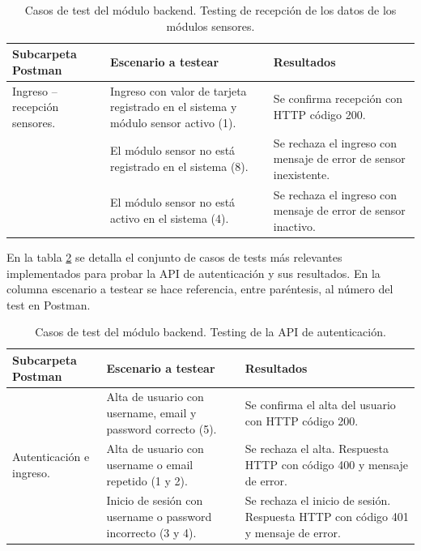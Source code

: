 \begin{table}[h]
	\centering
	\caption[Tipos de pruebas backend. Recepción de los datos de los módulos sensores]{Casos de test del módulo backend. Testing de recepción de los datos de los módulos sensores.}
	\begin{tabular}{p{3.5cm} p{4.5cm} p{4cm}} 	

		\toprule
		\textbf{Subcarpeta Postman} & 
		\textbf{Escenario a testear} &
		\textbf{Resultados} 
		\\
		\midrule

 Ingreso – recepción sensores.                  
& Ingreso con valor de tarjeta registrado en el sistema y módulo sensor activo (1).
& Se confirma recepción con HTTP código 200.  \\
& El módulo sensor no está registrado en el sistema  (8).
& Se rechaza el ingreso con mensaje de error de sensor inexistente. \\
& El módulo sensor no está activo en el sistema (4). 
& Se rechaza el ingreso con mensaje de error de sensor inactivo. \\
		\bottomrule
		\hline
	\end{tabular}
	\label{tab:tablaTestBackendSensor}
\end{table}

En la tabla  \ref{tab:tablaTestBackendAutenticacion} se detalla el conjunto de casos de tests más relevantes implementados para probar la API de autenticación y sus resultados. En la columna escenario a testear se hace referencia, entre paréntesis, al número del test en Postman.

\begin{table}[h]
	\centering
	\caption[Tipos de pruebas backend. Testing de la API de autenticación]{Casos de test del módulo backend. Testing de la API de autenticación.}
	\begin{tabular}{p{3.5cm} p{4.5cm} p{4cm}} 	

		\toprule
		\textbf{Subcarpeta Postman} & 
		\textbf{Escenario a testear} &
		\textbf{Resultados} 
		\\
		\midrule
\multirow{3}{3.5cm}{Autenticación e ingreso.} & Alta de usuario con username, email y password correcto (5). & Se confirma el alta del usuario con HTTP código 200. \\
                    & Alta de usuario con username o email repetido (1 y 2). & Se rechaza el alta. Respuesta HTTP con código 400 y mensaje de error. \\
                    & Inicio de sesión con username o password incorrecto (3 y 4). & Se rechaza el inicio de sesión. Respuesta HTTP con código 401 y mensaje de error. \\
		\bottomrule
		\hline
	\end{tabular}
	\label{tab:tablaTestBackendAutenticacion}
\end{table}

